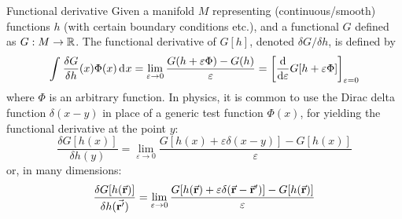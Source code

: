 \documentclass[../main/main.tex]{subfiles}
\begin{document}
\begin{definition}{Functional derivative}{}
Given a manifold \( M \)  representing (continuous/smooth) functions \( h \)  (with certain boundary conditions etc.), and a functional \( G \)  defined as \( G: M \rightarrow \mathbb{R} \).
The functional derivative of \( G[h] \), denoted \( \delta G/\delta h \), is defined by
\begin{equation*}
  \int_{}^{}  \frac{\delta G }{\delta h}\qty(x) \Phi  (x) \dd[]{x}
= \lim_{\varepsilon \rightarrow 0} \frac{G \qty(h  +  \varepsilon \Phi  )- G(h)}{\varepsilon }
=\qty[ \dv{}{\varepsilon }  G[ h + \varepsilon \Phi  ]]_{\varepsilon =0}
\end{equation*}
where \( \Phi  \) is an arbitrary function.
In physics, it is common to use the Dirac delta function \( \delta (x-y) \) in place of a generic test function \( \Phi (x) \), for yielding the functional derivative at the point \( y \):
\begin{equation*}
\frac{\delta G [h(x)] }{\delta h(y)}  = \lim_{\varepsilon \rightarrow 0}
\frac{G [h(x) + \varepsilon \delta (x-y) ] - G[h(x)]}{\varepsilon }
\end{equation*}
or, in many dimensions:
\begin{equation}
\frac{\delta G [h(\va{r})] }{\delta h(\va{r'})}  = \lim_{\varepsilon \rightarrow 0}
\frac{G [h(\va{r}) + \varepsilon \delta (\va{r}-\va{r}') ] - G[h(\va{r})]}{\varepsilon }
\end{equation}

\end{definition}
\end{document}
